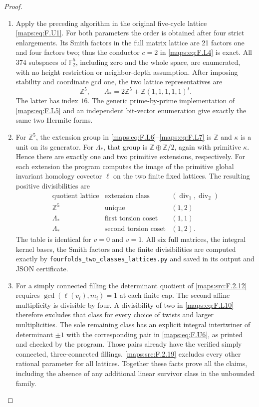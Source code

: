 \begin{proof}
\begin{enumerate}[label=\arabic*.]
\item Apply the preceding algorithm in the original five-cycle
lattice \eqref{maps:eq:F.U1}.  For both parameters the order is obtained
after four strict enlargements.  Its Smith factors in the
full matrix lattice are 21 factors one and four factors two;
thus the conductor $c=2$ in \eqref{maps:eq:F.L4} is exact.
All 374 subspaces of $\mathbb F_2^5$, including zero and
the whole space, are enumerated, with no height restriction
or neighbor-depth assumption.
After imposing stability and coordinate gcd one, the two
lattice representatives are
\[
 \mathbb Z^5,\qquad
 \Lambda_* =2\mathbb Z^5+\mathbb Z(1,1,1,1,1)^t.
 \tag{F.L9}\label{maps:eq:F.L9}
\]
The latter has index $16$.
The generic prime-by-prime implementation of \eqref{maps:eq:F.L5} and
an independent bit-vector enumeration give exactly the
same two Hermite forms.

\item For $\mathbb Z^5$, the extension group in \eqref{maps:eq:F.L6}--\eqref{maps:eq:F.L7}
is $\mathbb Z$ and $\kappa$ is a unit on its generator.
For $\Lambda_*$, that group is
$\mathbb Z\oplus\mathbb Z/2$, again with primitive
$\kappa$.  Hence there are exactly one and two primitive
extensions, respectively.
For each extension the program computes the image of the
primitive global invariant homology covector $\ell$ on
the two finite fixed lattices.  The resulting positive
divisibilities are
\[
\begin{array}{c|c|c}
 \text{quotient lattice}&\text{extension class}&
       (\operatorname{div}_1,\operatorname{div}_2)\\\hline
 \mathbb Z^5&\text{unique}&(1,2)\\
 \Lambda_*&\text{first torsion coset}&(1,1)\\
 \Lambda_*&\text{second torsion coset}&(1,2).
\end{array}
 \tag{F.L10}\label{maps:eq:F.L10}
\]
The table is identical for $v=0$ and $v=1$.
All six full matrices, the integral kernel bases, the
Smith factors and the finite divisibilities are computed
exactly by \texttt{fourfolds\_two\_classes\_lattices.py}
and saved in its output and JSON certificate.

\item For a simply connected filling the determinant quotient
of \ref{maps:src:F.2.12} requires $\gcd(\ell(v_i),m_i)=1$ at each
finite cap.  The second affine multiplicity is divisible
by four.  A divisibility of two in \eqref{maps:eq:F.L10} therefore
excludes that class for every choice of twists and larger
multiplicities.
The sole remaining class has an explicit integral
intertwiner of determinant $\pm1$ with the corresponding
pair in \eqref{maps:eq:F.U6}, as printed and checked by the program.
Those pairs already have the verified simply connected,
three-connected fillings.  \ref{maps:src:F.2.19} excludes every other
rational parameter for all lattices.
Together these facts prove all the claims, including the
absence of any additional linear survivor class in the
unbounded family.


\end{enumerate}
\end{proof}
